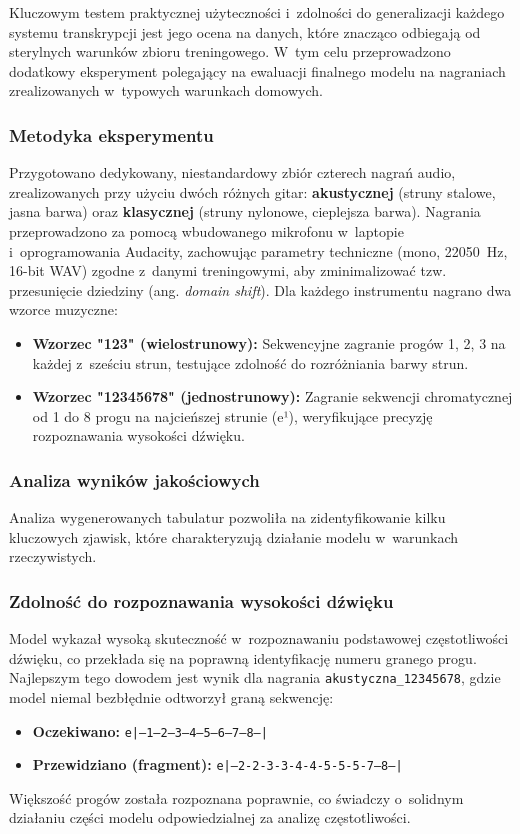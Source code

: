 Kluczowym testem praktycznej użyteczności i~zdolności do generalizacji każdego systemu transkrypcji jest jego ocena na danych, które znacząco odbiegają od sterylnych warunków zbioru treningowego. W~tym celu przeprowadzono dodatkowy eksperyment polegający na ewaluacji finalnego modelu na nagraniach zrealizowanych w~typowych warunkach domowych.

\subsubsection{Metodyka eksperymentu}
\label{sssec:metodyka_rzeczywista}

Przygotowano dedykowany, niestandardowy zbiór czterech nagrań audio, zrealizowanych przy użyciu dwóch różnych gitar: \textbf{akustycznej} (struny stalowe, jasna barwa) oraz \textbf{klasycznej} (struny nylonowe, cieplejsza barwa). Nagrania przeprowadzono za pomocą wbudowanego mikrofonu w~laptopie i~oprogramowania Audacity, zachowując parametry techniczne (mono, 22050~Hz, 16-bit WAV) zgodne z~danymi treningowymi, aby zminimalizować tzw. przesunięcie dziedziny (ang. \textit{domain shift}). Dla każdego instrumentu nagrano dwa wzorce muzyczne:
\begin{itemize}
    \item \textbf{Wzorzec "123" (wielostrunowy):} Sekwencyjne zagranie progów 1, 2, 3 na każdej z~sześciu strun, testujące zdolność do rozróżniania barwy strun.
    \item \textbf{Wzorzec "12345678" (jednostrunowy):} Zagranie sekwencji chromatycznej od 1 do 8 progu na najcieńszej strunie (e¹), weryfikujące precyzję rozpoznawania wysokości dźwięku.
\end{itemize}

\subsubsection{Analiza wyników jakościowych}
\label{sssec:analiza_rzeczywista}
Analiza wygenerowanych tabulatur pozwoliła na zidentyfikowanie kilku kluczowych zjawisk, które charakteryzują działanie modelu w~warunkach rzeczywistych.

\subsubsection{Zdolność do rozpoznawania wysokości dźwięku}
Model wykazał wysoką skuteczność w~rozpoznawaniu podstawowej częstotliwości dźwięku, co przekłada się na poprawną identyfikację numeru granego progu. Najlepszym tego dowodem jest wynik dla nagrania \texttt{akustyczna\_12345678}, gdzie model niemal bezbłędnie odtworzył graną sekwencję:
\begin{itemize}
    \item \textbf{Oczekiwano:} \texttt{e|--1--2--3--4--5--6--7--8--|}
    \item \textbf{Przewidziano (fragment):} \texttt{e|--2-2-3-3-4-4-5-5-5-7--8--|}
\end{itemize}
Większość progów została rozpoznana poprawnie, co świadczy o~solidnym działaniu części modelu odpowiedzialnej za analizę częstotliwości.

